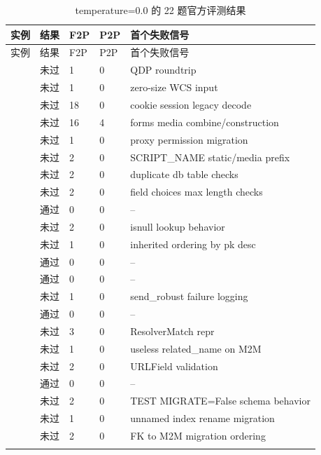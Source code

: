 \documentclass[UTF8,a4paper,11pt]{ctexart}
\begin{document}
\clearpage

\begin{center}
{\scriptsize
\begin{longtable}{L{3.7cm} C{1.2cm} C{1.1cm} C{1.1cm} L{6.8cm}}
\toprule
实例 & 结果 & F2P & P2P & 首个失败信号 \\
\midrule
\endfirsthead
\toprule
实例 & 结果 & F2P & P2P & 首个失败信号 \\
\midrule
\endhead
{} & 未过 & 1 & 0 & QDP roundtrip \\
 & 未过 & 1 & 0 & zero-size WCS input \\
 & 未过 & 18 & 0 & cookie session legacy decode \\
 & 未过 & 16 & 4 & forms media combine/construction \\
 & 未过 & 1 & 0 & proxy permission migration \\
 & 未过 & 2 & 0 & SCRIPT\_NAME static/media prefix \\
 & 未过 & 2 & 0 & duplicate db table checks \\
 & 未过 & 2 & 0 & field choices max length checks \\
 & 通过 & 0 & 0 & -- \\
 & 未过 & 2 & 0 & isnull lookup behavior \\
 & 未过 & 1 & 0 & inherited ordering by pk desc \\
 & 通过 & 0 & 0 & -- \\
 & 通过 & 0 & 0 & -- \\
 & 未过 & 1 & 0 & send\_robust failure logging \\
 & 通过 & 0 & 0 & -- \\
 & 未过 & 3 & 0 & ResolverMatch repr \\
 & 未过 & 1 & 0 & useless related\_name on M2M \\
 & 未过 & 2 & 0 & URLField validation \\
 & 通过 & 0 & 0 & -- \\
 & 未过 & 2 & 0 & TEST MIGRATE=False schema behavior \\
 & 未过 & 1 & 0 & unnamed index rename migration \\
 & 未过 & 2 & 0 & FK to M2M migration ordering \\
\bottomrule
\caption{temperature=0.0 的 22 题官方评测结果}
\end{longtable}
}
\end{center}
\end{document}
